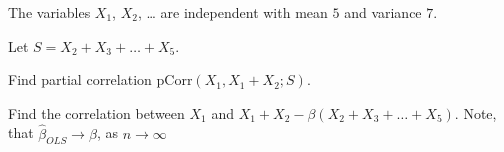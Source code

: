 
\begin{question}
The variables \(X_1\), \(X_2\), \ldots{} are independent with mean \(5\) and variance \(7\).

Let \(S = X_{2} + X_{3} + \ldots + X_{5}\).

Find partial correlation \(\mathrm{pCorr}(X_1, X_1 + X_2; S)\).
\end{question}

\begin{solution}
Find the correlation between \(X_1\) and \(X_1+X_2 - \beta (X_{2} + X_{3} + \ldots + X_{5})\). Note, that \(\hat{\beta}_{OLS} \to \beta\), as \(n\to \infty\)
\end{solution}

